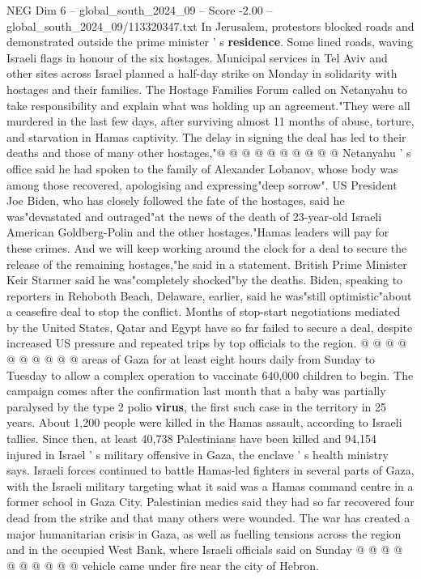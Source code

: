 \begin{textsample}{NEG Dim 6 – global\_south\_2024\_09 – Score -2.00 – global\_south\_2024\_09/113320347.txt}
In Jerusalem, protestors blocked roads and demonstrated outside the prime minister ' s \textbf{residence}.
Some lined roads, waving Israeli flags in honour of the six hostages.
Municipal services in Tel Aviv and other sites across Israel planned a half-day strike on Monday in solidarity with hostages and their families.
The Hostage Families Forum called on Netanyahu to take responsibility and explain what was holding up an agreement."They were all murdered in the last few days, after surviving almost 11 months of abuse, torture, and starvation in Hamas captivity.
The delay in signing the deal has led to their deaths and those of many other hostages,"@ @ @ @ @ @ @ @ @ @ Netanyahu ' s office said he had spoken to the family of Alexander Lobanov, whose body was among those recovered, apologising and expressing"deep sorrow".
US President Joe Biden, who has closely followed the fate of the hostages, said he was"devastated and outraged"at the news of the death of 23-year-old Israeli American Goldberg-Polin and the other hostages."Hamas leaders will pay for these crimes.
And we will keep working around the clock for a deal to secure the release of the remaining hostages,"he said in a statement.
British Prime Minister Keir Starmer said he was"completely shocked"by the deaths.
Biden, speaking to reporters in Rehoboth Beach, Delaware, earlier, said he was"still optimistic"about a ceasefire deal to stop the conflict.
Months of stop-start negotiations mediated by the United States, Qatar and Egypt have so far failed to secure a deal, despite increased US pressure and repeated trips by top officials to the region. @ @ @ @ @ @ @ @ @ @ areas of Gaza for at least eight hours daily from Sunday to Tuesday to allow a complex operation to vaccinate 640,000 children to begin.
The campaign comes after the confirmation last month that a baby was partially paralysed by the type 2 polio \textbf{virus}, the first such case in the territory in 25 years.
About 1,200 people were killed in the Hamas assault, according to Israeli tallies.
Since then, at least 40,738 Palestinians have been killed and 94,154 injured in Israel ' s military offensive in Gaza, the enclave ' s health ministry says.
Israeli forces continued to battle Hamas-led fighters in several parts of Gaza, with the Israeli military targeting what it said was a Hamas command centre in a former school in Gaza City.
Palestinian medics said they had so far recovered four dead from the strike and that many others were wounded.
The war has created a major humanitarian crisis in Gaza, as well as fuelling tensions across the region and in the occupied West Bank, where Israeli officials said on Sunday @ @ @ @ @ @ @ @ @ @ vehicle came under fire near the city of Hebron.

\end{textsample}

